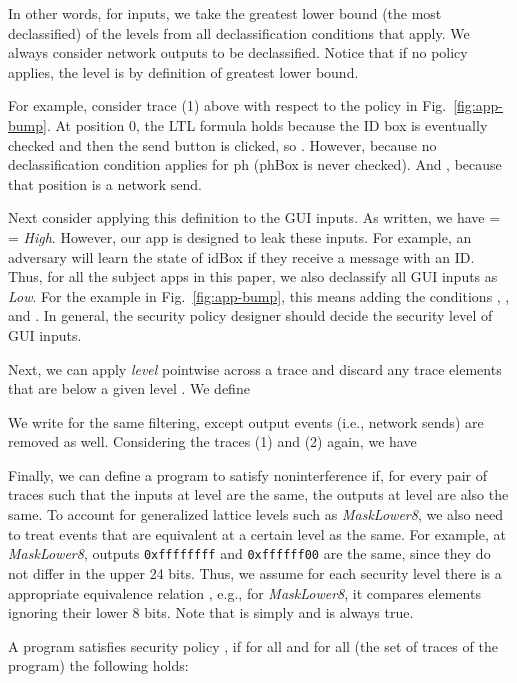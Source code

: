 \documentclass{llncs}
\newcommand{\code}[1]{\textsf{#1}} \newcommand{\bcode}[1]{\texttt{#1}}
\begin{document}
In other words, for inputs, we take the greatest lower bound (the most
declassified) of the levels from all declassification conditions that
apply. We always consider network outputs to be
declassified. Notice that if no policy applies, the level is  by
definition of greatest lower bound.

For example, consider trace (1) above with
respect to the policy in Fig.~\ref{fig:app-bump}.  At position 0, the
LTL formula holds because the ID box is eventually checked and then
the send button is clicked, so . However,
 because no
declassification condition applies for \code{ph}
(\code{phBox} is never checked). And , because that position is a network send.

Next consider applying this definition to the GUI inputs. As written,
we have  =  =
\textit{High}. However, our app is designed to leak these inputs. 
For example, an adversary will learn the state of
\code{idBox} if they receive a message with an ID. Thus,
for all the subject apps in this paper, we also declassify all GUI inputs as
\textit{Low}. 
For the example in Fig.~\ref{fig:app-bump}, this means
adding the conditions
,
, and
. In general, 
the security policy designer should decide the security level of GUI inputs.

Next, we can apply \textit{level} pointwise across a trace and discard
any trace elements that are below a given level . We define

We write  for the same filtering, except
output events (i.e., network sends) are removed as well.
Considering the traces (1) and (2) again, we have



Finally, we can define a program to satisfy noninterference if, for
every pair of traces such that the inputs at level  are the same,
the outputs at level  are also the same.
To account for generalized lattice levels such as \textit{MaskLower8},
we also need to treat events that are equivalent at a certain level as
the same. For example, at \textit{MaskLower8}, outputs
\bcode{0xffffffff} and \bcode{0xffffff00} are the same, since they do
not differ in the upper 24 bits. Thus, we assume for each security
level  there is a appropriate equivalence relation , e.g., for
\textit{MaskLower8}, it compares elements ignoring their lower 8
bits. Note that  is simply  and
 is always true.

\begin{definition}
  \label{defn:noninterference}
  A program satisfies security policy , if for all  and for
  all  (the set of traces of the program) the following holds:

\end{definition}
\end{document}
